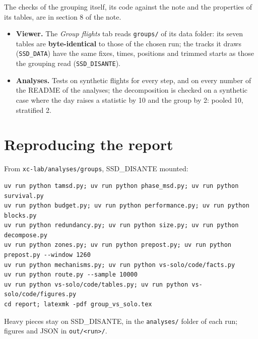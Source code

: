 The checks of the grouping itself, its code against the note and the properties of its tables, are in
section 8 of the note.

\begin{itemize}
  \item \textbf{Viewer.} The \emph{Group flights} tab reads \texttt{groups/} of its data folder: its seven tables are \textbf{byte-identical} to those of the chosen run; the tracks it draws (\texttt{SSD\_DATA}) have the same fixes,
        times, positions and trimmed starts as those the grouping read (\texttt{SSD\_DISANTE}).
  \item \textbf{Analyses.} Tests on synthetic flights for every step, and on every number of the README of the analyses; the decomposition is checked on a synthetic case where the day raises
        a statistic by 10 and the group by 2: pooled 10, stratified 2.
\end{itemize}

\section{Reproducing the report}\label{app:reproduce}

From \texttt{xc-lab/analyses/groups}, SSD\_DISANTE mounted:
\begin{verbatim}
uv run python tamsd.py; uv run python phase_msd.py; uv run python survival.py
uv run python budget.py; uv run python performance.py; uv run python blocks.py
uv run python redundancy.py; uv run python size.py; uv run python decompose.py
uv run python zones.py; uv run python prepost.py; uv run python prepost.py --window 1260
uv run python mechanisms.py; uv run python vs-solo/code/facts.py
uv run python route.py --sample 10000
uv run python vs-solo/code/tables.py; uv run python vs-solo/code/figures.py
cd report; latexmk -pdf group_vs_solo.tex
\end{verbatim}
Heavy pieces stay on SSD\_DISANTE, in the \texttt{analyses/} folder of each run; figures and JSON in \texttt{out/<run>/}.
